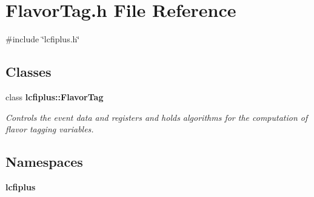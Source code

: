 \section{Flavor\+Tag.\+h File Reference}
\label{FlavorTag_8h}
{\ttfamily \#include \char`\"{}lcfiplus.\+h\char`\"{}}\newline
\subsection*{Classes}
\begin{DoxyCompactItemize}
\item 
class \textbf{ lcfiplus\+::\+Flavor\+Tag}
\begin{DoxyCompactList}\small\item\em Controls the event data and registers and holds algorithms for the computation of flavor tagging variables. \end{DoxyCompactList}\end{DoxyCompactItemize}
\subsection*{Namespaces}
\begin{DoxyCompactItemize}
\item 
 \textbf{ lcfiplus}
\end{DoxyCompactItemize}
